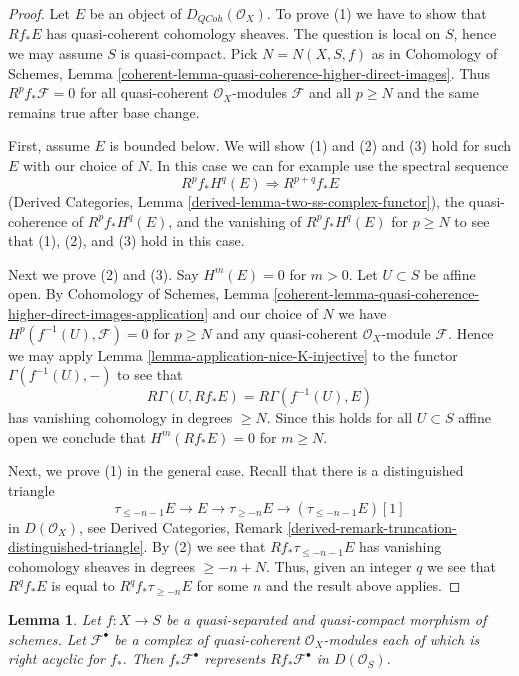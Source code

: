 \documentclass{stacks-project}
\theoremstyle{plain}
\newtheorem{lemma}[subsection]{Lemma}
\theoremstyle{definition}
\theoremstyle{remark}
\numberwithin{equation}{subsection}
\def\QCoh{\mathit{QCoh}}
\begin{document}
\begin{proof}
Let $E$ be an object of $D_\QCoh(\mathcal{O}_X)$. To prove (1) we have to
show that $Rf_*E$ has quasi-coherent cohomology sheaves. The question is local
on $S$, hence we may assume $S$ is quasi-compact. Pick $N = N(X, S, f)$ as in
Cohomology of Schemes, Lemma
\ref{coherent-lemma-quasi-coherence-higher-direct-images}.
Thus $R^pf_*\mathcal{F} = 0$ for all quasi-coherent $\mathcal{O}_X$-modules
$\mathcal{F}$ and all $p \geq N$ and the same remains true after base change.

\medskip\noindent
First, assume $E$ is bounded below. We will show (1) and (2) and (3) hold
for such $E$ with our choice of $N$. In this case we can for example use the
spectral sequence
$$
R^pf_*H^q(E) \Rightarrow R^{p + q}f_*E
$$
(Derived Categories, Lemma \ref{derived-lemma-two-ss-complex-functor}),
the quasi-coherence of $R^pf_*H^q(E)$, and the vanishing of $R^pf_*H^q(E)$
for $p \geq N$ to see that (1), (2), and (3) hold in this case.

\medskip\noindent
Next we prove (2) and (3). Say $H^m(E) = 0$ for $m > 0$.
Let $U \subset S$ be affine open. By Cohomology of Schemes, Lemma
\ref{coherent-lemma-quasi-coherence-higher-direct-images-application}
and our choice of $N$
we have $H^p(f^{-1}(U), \mathcal{F}) = 0$ for $p \geq N$
and any quasi-coherent $\mathcal{O}_X$-module $\mathcal{F}$.
Hence we may apply Lemma \ref{lemma-application-nice-K-injective}
to the functor $\Gamma(f^{-1}(U), -)$ to see that
$$
R\Gamma(U, Rf_*E) = R\Gamma(f^{-1}(U), E)
$$
has vanishing cohomology in degrees $\geq N$. Since this holds for
all $U \subset S$ affine open we conclude that $H^m(Rf_*E) = 0$
for $m \geq N$.

\medskip\noindent
Next, we prove (1) in the general case. Recall that there is a
distinguished triangle
$$
\tau_{\leq -n - 1}E \to E \to \tau_{\geq -n}E \to
(\tau_{\leq -n - 1}E)[1]
$$
in $D(\mathcal{O}_X)$, see Derived Categories, Remark
\ref{derived-remark-truncation-distinguished-triangle}.
By (2) we see that $Rf_*\tau_{\leq -n - 1}E$
has vanishing cohomology sheaves in degrees $\geq -n + N$.
Thus, given an integer $q$ we see that $R^qf_*E$ is equal
to $R^qf_*\tau_{\geq -n}E$ for some $n$ and the result
above applies.
\end{proof}

\begin{lemma}
\label{lemma-acyclicity-lemma}
Let $f : X \to S$ be a quasi-separated and quasi-compact morphism
of schemes. Let $\mathcal{F}^\bullet$ be a complex of quasi-coherent
$\mathcal{O}_X$-modules each of which is right acyclic for $f_*$.
Then $f_*\mathcal{F}^\bullet$ represents $Rf_*\mathcal{F}^\bullet$
in $D(\mathcal{O}_S)$.
\end{lemma}
\end{document}
